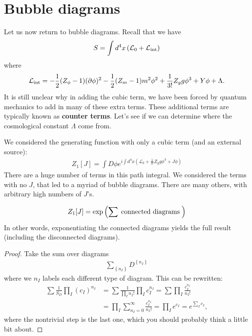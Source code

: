 \documentclass{../mathnotes}
\begin{document}
\section*{Bubble diagrams}

Let us now return to bubble diagrams. Recall that we have
\begin{align*}
    S=\int d^4x\left( \mathcal{L}_0 +\mathcal{L}_{\rm int}\right)
\end{align*}
where
\begin{align*}
    \mathcal{L}_{\rm int}=-\frac{1}{2}(Z_\phi - 1)(\partial \phi)^2-\frac{1}{2}(Z_m-1)m^2\phi^2+\frac{1}{3!}Z_gg\phi^3+Y\phi +\Lambda.
\end{align*}
It is still unclear why in adding the cubic term, we have been forced by quantum mechanics to add in many of these extra terms.
These additional terms are typically known as \textbf{counter terms}.
Let's see if we can determine where the cosmological constant $\Lambda$ come from.

We considered the generating function with only a cubic term (and an external source):
\begin{align*}
    Z_1[J]=\int D\phi e^{i\int d^4x\left( \mathcal{L}_0+\frac{1}{3!}Z_gg\phi^3+J\phi \right)}
\end{align*}
There are a huge number of terms in this path integral. We considered the terms with no $J$, that led to a myriad of bubble diagrams.
There are many others, with arbitrary high numbers of $J$'s.

\begin{thm}
    \begin{align*}
        Z_1[J]=\exp\left(\sum\;\textnormal{connected diagrams}\;\right)
    \end{align*}
    In other words, exponentiating the connected diagrams yields the full result (including the disconnected diagrams).
\end{thm}
\begin{proof}
    Take the sum over diagrams
    \begin{align*}
        \sum_{\left\{ n_I \right\}} D^{\left\{ n_I \right\}}
    \end{align*}
    where we $n_I$ labels each different type of diagram. This can be rewritten:
    \begin{align*}
        \sum\frac{1}{S_D}\prod_I(c_I)^{n_I}&=\sum\frac{1}{\prod_In_I!}\prod_Ic_I^{n_I}=\sum\prod_I\frac{c_I^{n_I}}{n_I!}\\
        &=\prod_I\sum_{n_I=0}^\infty \frac{c_I^{n_I}}{n_I!}=\prod_I e^{c_I}=e^{\sum_Ic_I},
    \end{align*}
    where the nontrivial step is the last one, which you should probably think a little bit about.
\end{proof}
\end{document}
